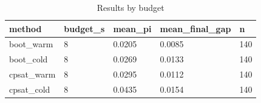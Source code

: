 \begin{table}[t]
\centering
\begin{tabular}{lllll}
\toprule
method & budget\_s & mean\_pi & mean\_final\_gap & n \\
\midrule
boot\_warm & 8 & 0.0205 & 0.0085 & 140 \\
boot\_cold & 8 & 0.0269 & 0.0133 & 140 \\
cpsat\_warm & 8 & 0.0295 & 0.0112 & 140 \\
cpsat\_cold & 8 & 0.0435 & 0.0154 & 140 \\
\bottomrule
\end{tabular}
\caption{Results by budget}
\label{tab:by-budget}
\end{table}

